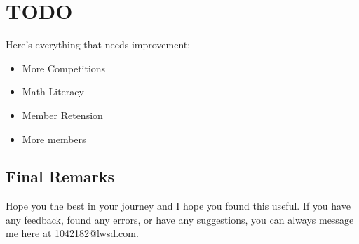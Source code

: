 \chapter{TODO}

Here's everything that needs improvement:

\begin{itemize}
    \item More Competitions
    \item Math Literacy
    \item Member Retension
    \item More members
\end{itemize}


\newpage
\section*{Final Remarks}
Hope you the best in your journey and I hope you found this useful.
If you have any feedback, found any errors, or have any suggestions,
you can always message me here at \href{mailto:1042182@lwsd.com}{1042182@lwsd.com}.  